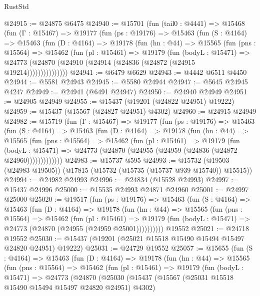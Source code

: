 \begin{lexlean}{RustStd}
\begin{coremodule}
@24915 := @24875 @6475
@24940 := @15701
    (fun (tail0 : @4441) =>
    @15468
      (fun (Γ : @15467) =>
      @19177
        (fun (ps : @19176) =>
        @15463
          (fun (S : @4164) =>
          @15463
            (fun (D : @4164) =>
            @19178
              (fun (hn : @44) =>
              @15565
                (fun (pns : @15564) =>
                @15462
                  (fun (pl : @15461) =>
                  @19179
                    (fun (bodyL : @15471) =>
                    @24773 (@24870 (@24910 (@24914 (@24836 (@24872 (@24915 @19214)))))))))))))))
@24941 := @6479 @6629
@24943 := @4442 @6511 @4450
@24944 := @5581 @24943
@24945 := @5580 @24944
@24947 := @5645 @24945 @4247
@24949 := @24941 (@6491 @24947)
@24950 := @24940 @24949
@24951 := @24905 @24949
@24955 := @15437 (@19201 (@24822 @24951) @19222)
@24959 := @15437 (@15567 (@24827 @24951) @4302)
@24960 := @24915 @24949
@24982 := @15719
    (fun (Γ : @15467) =>
    @19177
      (fun (ps : @19176) =>
      @15463
        (fun (S : @4164) =>
        @15463
          (fun (D : @4164) =>
          @19178
            (fun (hn : @44) =>
            @15565
              (fun (pns : @15564) =>
              @15462
                (fun (pl : @15461) =>
                @19179
                  (fun (bodyL : @15471) =>
                  @24773 (@24870 (@24955 (@24959 (@24836 (@24872 @24960)))))))))))))
@24983 := @15737 @595
@24993 := @15732 (@19503 (@24983 @19505)) (@17815 (@15732 (@15735 (@15737 @939 @15740)) @15515))
@24994 := @24982 @24993
@24996 := @24834 (@15528 @24993)
@24997 := @15437 @24996
@25000 := @15535 @24993 @24871 @24960
@25001 := @24997 @25000
@25020 := @19517
    (fun (ps : @19176) =>
    @15463
      (fun (S : @4164) =>
      @15463
        (fun (D : @4164) =>
        @19178
          (fun (hn : @44) =>
          @15565
            (fun (pns : @15564) =>
            @15462
              (fun (pl : @15461) =>
              @19179 (fun (bodyL : @15471) => @24773 (@24870 (@24955 (@24959 @25001))))))))))
    @19552
@25021 := @24718 @19552
@25030 := @15437 (@19201 (@25021 @15518 @15490 @15494 @15497 @24820 @24951) @19222)
@25031 := @24729 @19552
@25057 := @15655
    (fun (S : @4164) =>
    @15463
      (fun (D : @4164) =>
      @19178
        (fun (hn : @44) =>
        @15565
          (fun (pns : @15564) =>
          @15462
            (fun (pl : @15461) =>
            @19179
              (fun (bodyL : @15471) =>
              @24773
                (@24870
                  (@25030
                    (@15437
                      (@15567 (@25031 @15518 @15490 @15494 @15497 @24820 @24951) @4302)

\end{coremodule}
\end{lexlean}
